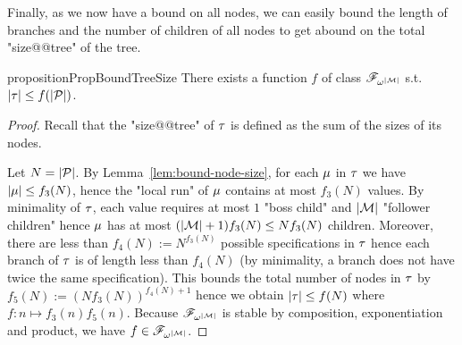 Finally, as we now have a bound on all nodes, we can easily bound the length of branches and the number of children of all nodes to get abound on the total "size@@tree" of the tree.

\begin{restatable}{proposition}{PropBoundTreeSize}
	\label{prop:bound-tree-size}
	There exists a function $f$ of class $\mathscr{F}_{\omega^{|\mathcal{M}|}}$ s.t. $|\tau| \leq f(|\mathcal{P}|)$.
\end{restatable}

\begin{proof}
	Recall that the "size@@tree" of $\tau$ is defined as the sum of the sizes of its nodes. 

	Let $N = |\mathcal{P}|$. 
	By Lemma~\ref{lem:bound-node-size}, for each $\mu$ in $\tau$ we have $|\mu| \leq f_3(N)$, hence the "local run" of $\mu$ contains at most $f_3(N)$ values. By minimality of $\tau$, each value requires at most $1$ "boss child" and $|\mathcal{M}|$ "follower children" hence $\mu$ has at most $(|\mathcal{M}|+1) f_3(N) \leq N f_3(N)$ children. Moreover, there are less than $f_4(N) := N^{f_3(N)}$ possible specifications in $\tau$ hence each branch of $\tau$ is of length less than $f_4(N)$ (by minimality, a branch does not have twice the same specification). This bounds the total number of nodes in $\tau$ by $f_5(N) := (N f_3(N))^{f_4(N) +1}$ hence we obtain $|\tau| \leq f(N)$ where $f: n \mapsto f_3(n) f_5(n)$. Because $\mathscr{F}_{\omega^{|\mathcal{M}|}}$ is stable by composition, exponentiation and product, we have $f \in \mathscr{F}_{\omega^{|\mathcal{M}|}}$.
\end{proof}

